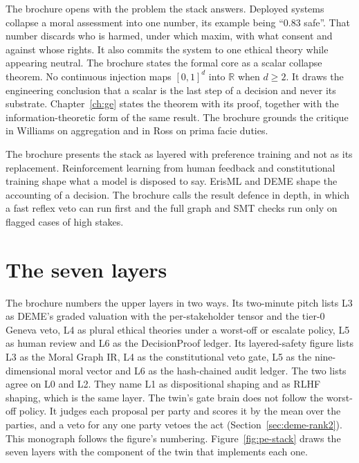 The brochure opens with the problem the stack answers. Deployed systems collapse a moral
assessment into one number, its example being ``0.83 safe''. That number discards who is harmed,
under which maxim, with what consent and against whose rights. It also commits the system to one
ethical theory while appearing neutral.
The brochure states the formal core as a scalar collapse theorem. No continuous injection maps
$[0,1]^d$ into $\mathbb{R}$ when $d \geq 2$. It draws the engineering conclusion that a scalar is
the last step of a decision and never its substrate.
Chapter~\ref{ch:ge} states the theorem with its proof, together with the information-theoretic
form of the same result. The brochure grounds the critique in Williams on aggregation and in
Ross on prima facie duties.
\cite{williams1985ethics}\cite{ross1930right}

The brochure presents the stack as layered with preference training and not as its replacement.
Reinforcement learning from human feedback and constitutional training shape what a model is
disposed to say.\cite{christiano2017rlhf,bai2022constitutional} ErisML and DEME shape the
accounting of a decision. The brochure calls the result defence in depth, in which a fast reflex
veto can run first and the full graph and SMT checks run only on flagged cases of high stakes.

\section{The seven layers}\label{sec:pe-layers}

The brochure numbers the upper layers in two ways. Its two-minute pitch lists L3 as DEME's graded
valuation with the per-stakeholder tensor and the tier-0 Geneva veto, L4 as plural ethical
theories under a worst-off or escalate policy, L5 as human review and L6 as the DecisionProof
ledger. Its layered-safety figure lists L3 as the Moral Graph IR, L4 as the constitutional veto
gate, L5 as the nine-dimensional moral vector and L6 as the hash-chained audit ledger. The two
lists agree on L0 and L2. They name L1 as dispositional shaping and as RLHF shaping, which is
the same layer.
The twin's gate brain does not follow the worst-off policy. It judges each proposal per party and
scores it by the mean over the parties, and a veto for any one party vetoes the act
(Section~\ref{sec:deme-rank2}).
This monograph follows the figure's numbering. Figure~\ref{fig:pe-stack} draws the seven layers
with the component of the twin that implements each one.

